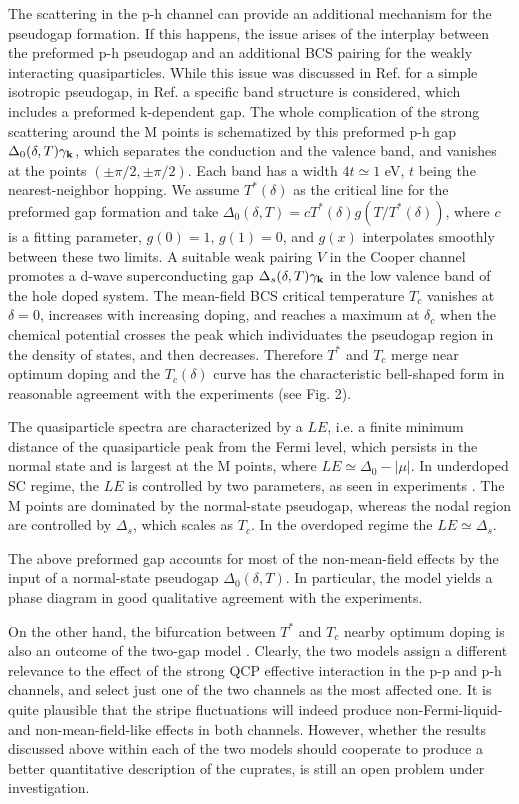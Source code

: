 \documentclass[twoside]{article}
\begin{document}
The scattering in the p-h channel can provide an additional mechanism for the
pseudogap formation. If this happens, the issue arises of the interplay
between the preformed p-h pseudogap and an additional BCS pairing for the
weakly interacting quasiparticles. While this issue was discussed in Ref.
\cite{nozieres} for a simple isotropic pseudogap, in Ref. \cite{benfatto} a
specific band structure is considered, which includes a preformed k-dependent
gap. The whole complication of the strong scattering around the M points is
schematized by this preformed p-h gap $\Delta_0(\delta,T) \gamma_{\bf k}$,
which separates the conduction and the valence band, and vanishes at the
points $(\pm \pi/2,\pm \pi/2)$. Each band has a width $4t\simeq 1$ eV, $t$
being the nearest-neighbor hopping. We assume $T^*(\delta)$ as the critical
line for the preformed gap formation and take $\Delta_0(\delta,T)=c
T^*(\delta) g(T/T^*(\delta))$, where $c$ is a fitting parameter, $g(0)=1$,
$g(1)=0$, and $g(x)$ interpolates smoothly between these two limits. A
suitable weak pairing $V$ in the Cooper channel promotes a d-wave
superconducting gap $\Delta_s(\delta,T) \gamma_{\bf k}$ in the low valence
band of the hole doped system. The mean-field BCS critical temperature $T_c$
vanishes at $\delta=0$, increases with increasing doping, and reaches a maximum
at $\delta_c$ when the chemical potential crosses the peak which individuates
the pseudogap region in the density of states, and then decreases. Therefore
$T^*$ and $T_c$ merge near optimum doping and the $T_c(\delta)$ curve has the
characteristic bell-shaped form in reasonable agreement with the experiments
(see Fig. 2).

The quasiparticle spectra are characterized by a $LE$, i.e. a finite minimum
distance of the quasiparticle peak from the Fermi level, which persists in
the normal state and is largest at the M points, where $LE\simeq \Delta_0-
|\mu|$. In underdoped SC regime, the $LE$ is controlled by two parameters, as
seen in experiments \cite{PX,TWO}. The M points are dominated by the
normal-state pseudogap, whereas the nodal region are controlled by
$\Delta_s$, which scales as $T_c$. In the overdoped regime the $LE\simeq
\Delta_s$.

The above preformed gap accounts for most of the non-mean-field effects by
the input of a normal-state pseudogap $\Delta_0(\delta,T)$. In particular,
the model yields a phase diagram in good qualitative agreement with the
experiments.

On the other hand, the bifurcation between $T^*$ and $T_c$ nearby optimum
doping is also an outcome of the two-gap model \cite{twogap}. Clearly, the
two models assign a different relevance to the effect of the strong QCP
effective interaction in the p-p and p-h channels, and select just one of the
two channels as the most affected one. It is quite plausible that the stripe
fluctuations will indeed produce non-Fermi-liquid- and non-mean-field-like
effects in both channels. However, whether the results discussed above within
each of the two models should cooperate to produce a better quantitative
description of the cuprates, is still an open problem under investigation.
\end{document}
